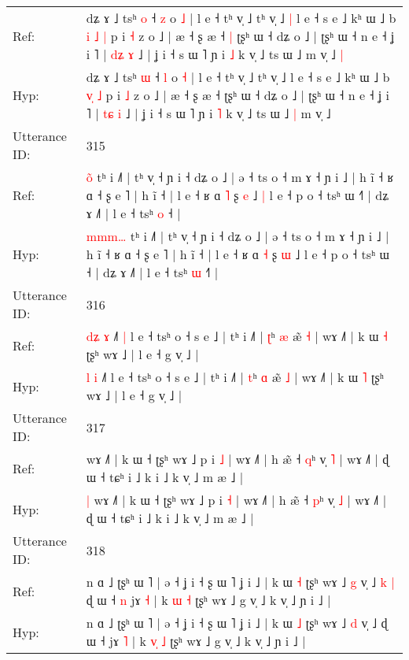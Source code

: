 \documentclass[10pt]{article}
\DeclareRobustCommand{\hl}[1]{{\textcolor{red}{#1}}}
\begin{document}
\begin{longtable}{ll}
Ref: & dʑ ɤ ˩ tsʰ \hl{o} ˧ \hl{z} o \hl{˩} | l e ˧ tʰ v̩ ˩ tʰ v̩ ˩\hl{ }\hl{|} l e ˧ s e ˩ kʰ ɯ ˩ b \hl{i}\hl{ }\hl{˩} \hl{|} p i \hl{˧} z o ˩ | æ ˧ ʂ æ ˧\hl{ }\hl{|} ʈʂʰ ɯ ˧ dʑ o ˩ | ʈʂʰ ɯ ˧ n e ˧ ʝ i ˥ | \hl{d}\hl{ʑ} \hl{ɤ} ˩ | ʝ i ˧ s ɯ ˥ ɲ i \hl{˩} k v̩ ˩ ts ɯ ˩\hl{}\hl{} m v̩ ˩\hl{ }\hl{|}
 \\
Hyp: & dʑ ɤ ˩ tsʰ \hl{ɯ} ˧ \hl{l} o \hl{˧} | l e ˧ tʰ v̩ ˩ tʰ v̩ ˩\hl{}\hl{} l e ˧ s e ˩ kʰ ɯ ˩ b \hl{}\hl{v}\hl{̩} \hl{˩} p i \hl{˩} z o ˩ | æ ˧ ʂ æ ˧\hl{}\hl{} ʈʂʰ ɯ ˧ dʑ o ˩ | ʈʂʰ ɯ ˧ n e ˧ ʝ i ˥ | \hl{t}\hl{ɕ} \hl{i} ˩ | ʝ i ˧ s ɯ ˥ ɲ i \hl{˥} k v̩ ˩ ts ɯ ˩\hl{ }\hl{|} m v̩ ˩\hl{}\hl{}
 \\
\midrule
Utterance ID: & 315 \\
Ref: & \hl{}\hl{}\hl{o}\hl{̃} tʰ i ˩˥ | tʰ v̩ ˧ ɲ i ˧ dʑ o ˩ | ə ˧ ts o ˧ m ɤ ˧ ɲ i ˩ | h ĩ ˧ ʁ ɑ ˧ ʂ e ˥ | h ĩ ˧ | l e ˧ ʁ ɑ \hl{˥} ʂ \hl{e} ˩\hl{ }\hl{|} l e ˧ p o ˧ tsʰ ɯ ˧\hl{˥} | dʑ ɤ ˩˥ | l e ˧ tsʰ \hl{o} ˧\hl{} |
 \\
Hyp: & \hl{m}\hl{m}\hl{m}\hl{…} tʰ i ˩˥ | tʰ v̩ ˧ ɲ i ˧ dʑ o ˩ | ə ˧ ts o ˧ m ɤ ˧ ɲ i ˩ | h ĩ ˧ ʁ ɑ ˧ ʂ e ˥ | h ĩ ˧ | l e ˧ ʁ ɑ \hl{˧} ʂ \hl{ɯ} ˩\hl{}\hl{} l e ˧ p o ˧ tsʰ ɯ ˧\hl{} | dʑ ɤ ˩˥ | l e ˧ tsʰ \hl{ɯ} ˧\hl{˥} |
 \\
\midrule
Utterance ID: & 316 \\
Ref: & \hl{d}\hl{ʑ} \hl{ɤ} ˩˥\hl{ }\hl{|} l e ˧ tsʰ o ˧ s e ˩ | tʰ i ˩˥ | \hl{ʈ}ʰ \hl{æ} æ̃ \hl{˧} | wɤ ˩˥ | k ɯ \hl{˧} ʈʂʰ wɤ ˩ | l e ˧ g v̩ ˩ |
 \\
Hyp: & \hl{}\hl{l} \hl{i} ˩˥\hl{}\hl{} l e ˧ tsʰ o ˧ s e ˩ | tʰ i ˩˥ | \hl{t}ʰ \hl{ɑ} æ̃ \hl{˩} | wɤ ˩˥ | k ɯ \hl{˥} ʈʂʰ wɤ ˩ | l e ˧ g v̩ ˩ |
 \\
\midrule
Utterance ID: & 317 \\
Ref: & \hl{}\hl{}wɤ ˩˥ | k ɯ ˧ ʈʂʰ wɤ ˩ p i \hl{˩} | wɤ ˩˥ | h æ̃ ˧ \hl{q}ʰ v̩ \hl{˥} | wɤ ˩˥ | ɖ ɯ ˧ tɕʰ i ˩ k i ˩ k v̩ ˩ m æ ˩ |
 \\
Hyp: & \hl{|}\hl{ }wɤ ˩˥ | k ɯ ˧ ʈʂʰ wɤ ˩ p i \hl{˧} | wɤ ˩˥ | h æ̃ ˧ \hl{p}ʰ v̩ \hl{˩} | wɤ ˩˥ | ɖ ɯ ˧ tɕʰ i ˩ k i ˩ k v̩ ˩ m æ ˩ |
 \\
\midrule
Utterance ID: & 318 \\
Ref: & n ɑ ˩ ʈʂʰ ɯ ˥ | ə ˧ ʝ i ˧ ʂ ɯ ˥ ʝ i ˩ | k ɯ \hl{˧} ʈʂʰ wɤ ˩ \hl{g} v̩ ˩\hl{ }\hl{k}\hl{ }\hl{|} ɖ ɯ ˧\hl{ }\hl{n} jɤ \hl{˧} | k \hl{}\hl{ɯ} \hl{˧} ʈʂʰ wɤ ˩ g v̩ ˩ k v̩ ˩ ɲ i ˩ |
 \\
Hyp: & n ɑ ˩ ʈʂʰ ɯ ˥ | ə ˧ ʝ i ˧ ʂ ɯ ˥ ʝ i ˩ | k ɯ \hl{˩} ʈʂʰ wɤ ˩ \hl{d} v̩ ˩\hl{}\hl{}\hl{}\hl{} ɖ ɯ ˧\hl{}\hl{} jɤ \hl{˥} | k \hl{v}\hl{̩} \hl{˩} ʈʂʰ wɤ ˩ g v̩ ˩ k v̩ ˩ ɲ i ˩ |

\end{longtable}
\end{document}
